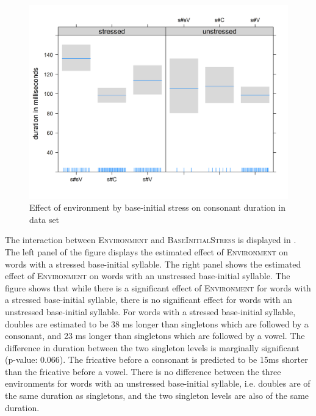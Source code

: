 \begin{figure} [b!]
\vspace*{-0.7cm}
	\centering
	\includegraphics [scale=0.5]{images/Corpus/disModelTransitionTypeByStress.png}
	\caption{Effect of environment by base-initial stress on consonant duration in data set}
	\label{fig:corpus main effect 1 dis}
\end{figure}

The interaction between \textsc{Environment} and \textsc{BaseInitialStress} is displayed in . The left panel of the figure displays the estimated effect of \textsc{Environment} on words with a stressed base-initial syllable. The right panel shows the estimated effect of \textsc{Environment} on words with an unstressed base-initial syllable. The figure shows that while there is a significant effect of \textsc{Environment} for words with a stressed base-initial syllable, there is no significant effect for words with an unstressed base-initial syllable. For words with a stressed base-initial syllable, doubles are estimated to be 38 ms  longer than singletons which are followed by a consonant, and 23 ms longer than singletons which are followed by a vowel. 
The difference in duration between the two singleton levels is marginally significant (p-value: $0.066$). The fricative before a consonant is predicted to be 15ms shorter than the fricative before a vowel.  There is no difference between the three environments for words with an unstressed base-initial syllable, i.e. doubles are of the same duration as singletons, and the two singleton levels are  also of the same duration. 


